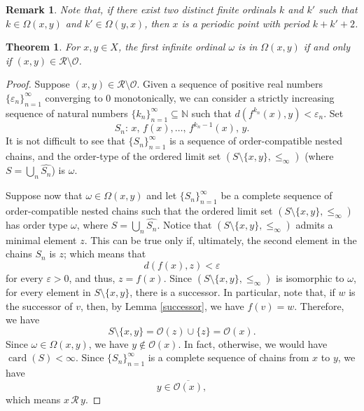 \documentclass[10pt,a4paper]{article}
\theoremstyle{definition}
\theoremstyle{remark}
\theoremstyle{plain}
\newtheorem{thm}[defi]{Theorem}
\newtheorem{rem}[defi]{Remark}
\begin{document}
\begin{rem}
    Note that, if there exist two distinct finite ordinals $k$ and $k'$ such that $k\in\Omega(x,y)$ and $k'\in\Omega(y,x)$, then $x$ is a periodic point with period $k+k'+2$.
\end{rem}
\begin{thm}\label{Omega_primo_R}
    For $x,y\in X$, the first infinite ordinal $\omega$ is in $\Omega(x,y)$ if and only if $(x,y)\in\mathcal{R}\setminus\mathcal{O}$.
\end{thm}
\begin{proof}
    Suppose $(x,y)\in\mathcal{R}\setminus\mathcal{O}$. Given a sequence of positive real numbers $\{\varepsilon_n\}_{n=1}^{\infty}$ converging to 0 monotonically,
    we can consider a strictly increasing sequence of natural numbers $\{k_n\}_{n=1}^{\infty}\subseteq\mathbb
    N$ such that $d(f^{k_n}(x),y)<\varepsilon_n$. Set
    $$S_n:\,x,\,f(x),\dots,\,f^{k_n-1}(x),\,y.$$ 
    It is not difficult to see that $\{S_n\}_{n=1}^{\infty}$ is a sequence of order-compatible nested chains, and the order-type of the ordered limit set $(S\setminus\{x,y\},\le_\infty)$ (where $S=\bigcup_n\widehat{S_n}$) is $\omega$.

 Suppose now that $\omega\in\Omega(x,y)$ and let $\{S_n\}_{n=1}^{\infty}$ be a complete sequence of order-compatible nested chains such that the ordered limit set $(S\setminus\{x,y\},\le_\infty)$ has order type $\omega$, where $S=\bigcup_n\widehat{S_n}$.
     Notice that $(S\setminus\{x,y\},\le_\infty)$ admits a minimal element $z$. This can be true only if, ultimately, the second element in the chains $S_n$ is $z$; which means that
     $$d(f(x),z)<\varepsilon$$
     for every $\varepsilon>0$, and thus, $z=f(x).$
     Since $(S\setminus\{x,y\},\le_\infty)$ is isomorphic to $\omega$, for every element in $S\setminus\{x,y\}$, there is a successor. In particular, note that, if $w$ is the successor of $v$, then, by Lemma \ref{successor}, we have $f(v)=w$.
     Therefore, we have
     $$S\setminus\{x,y\}=\mathcal{O}(z)\cup\{z\}=\mathcal{O}(x).$$
    Since $\omega\in\Omega(x,y)$, we have $y\notin\mathcal{O}(x)$. In fact, otherwise, we would have $\operatorname{card}(S)<\infty$. Since $\{S_n\}_{n=1}^{\infty}$ is a complete sequence of chains from $x$ to $y$, we have
    $$y\in\overline{\mathcal{O}(x)},$$
    which means $x\,\mathcal{R}\,y$. 
\end{proof}
\end{document}
